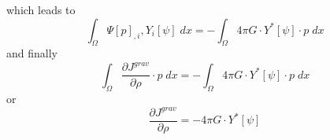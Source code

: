 which leads to 
\begin{equation}\label{ref:GRAV:EQU:20ee}
\int_{\Omega} \Psi[p]_{,i} ,Y_i[\psi]  \; dx  = - \int_{\Omega}  4\pi G \cdot Y^*[\psi] \cdot  p \; dx  
\end{equation}
and finally
\begin{equation}\label{ref:GRAV:EQU:201a}
\int_{\Omega}   \frac{\partial J^{grav}}{\partial \rho} \cdot p \;  dx  = - \int_{\Omega}  
4\pi G \cdot Y^*[\psi] \cdot  p \; dx  
\end{equation} 
or 
\begin{equation}\label{ref:GRAV:EQU:201b}
\frac{\partial J^{grav}}{\partial \rho}  =- 4\pi G \cdot Y^*[\psi]
\end{equation} 

